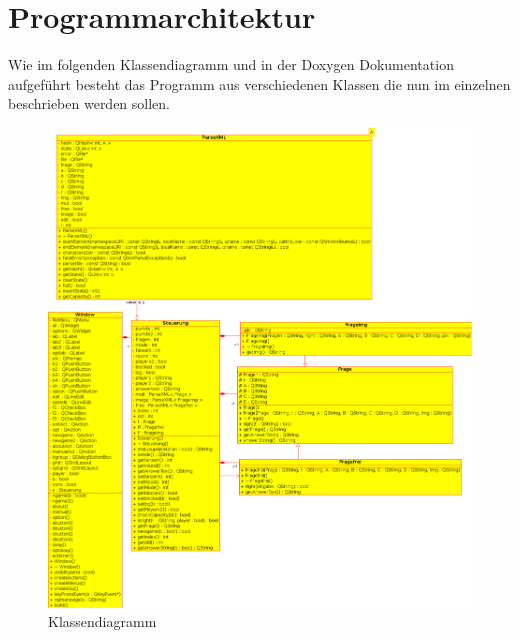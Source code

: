 \documentclass[10pt,a4paper,titlepage]{article}
\begin{document}
\section{Programmarchitektur}
Wie im folgenden Klassendiagramm und in der Doxygen Dokumentation aufgeführt besteht das Programm aus verschiedenen Klassen die nun im einzelnen beschrieben werden sollen.
\begin{figure}
	\includegraphics[width=\linewidth]{img/doku.png}
	\caption{Klassendiagramm}
\end{figure}
\end{document}
